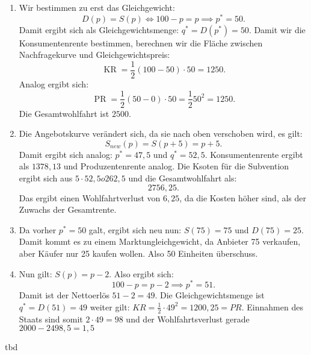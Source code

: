 \begin{solution}
	\begin{enumerate}
		\item Wir bestimmen zu erst das Gleichgewicht:
		      \[
			      D(p) = S(p) \iff 100-p = p \implies p^* = 50
			      .\]
		      Damit ergibt sich als Gleichgewichtsmenge: $q^*= D(p^*) = 50$. Damit wir die Konsumentenrente bestimmen, berechnen wir die Fläche zwischen Nachfragekurve und Gleichgewichtspreis:
		      \[
			      \operatorname{KR} = \frac{1}{2} (100-50) \cdot 50 = 1250
			      .\]
		      Analog ergibt sich:
		      \[
			      \operatorname{PR} = \frac{1}{2} (50-0) \cdot 50= \frac{1}{2} 50^2 = 1250
			      .\]
		      Die Gesamtwohlfahrt ist $2500$.
		\item Die Angebotskurve verändert sich, da sie nach oben verschoben wird, es gilt:
		      \[
			      S_{new}(p) = S(p+5) = p+5
			      .\]
		      Damit ergibt sich analog: $p^* = 47,5$ und $q^* = 52,5$.
		      Konsumentenrente ergibt  als $1378,13$ und Produzentenrente analog.
		      Die Ksoten für die Subvention ergibt sich aus $5 \cdot 52,5 o 262,5$ und die Gesamtwohlfahrt als:
		      \[
			      2756,25
			      .\] Das ergibt einen Wohlfahrtverlust von $6,25$, da die Kosten höher sind, als der Zuwachs der Gesamtrente.
		\item Da vorher $p^* = 50$ galt, ergibt sich neu nun: $S(75) = 75$ und $D(75) = 25$. Damit kommt es zu einem Marktungleichgewicht, da Anbieter 75 verkaufen, aber Käufer nur 25 kaufen wollen. Also 50 Einheiten überschuss.
		\item Nun gilt: $S(p) = p-2$. Also ergibt sich:
		      \[
			      100-p = p-2 \implies p^* = 51
			      .\]
		      Damit ist der Nettoerlös $51-2=49$. Die Gleichgewichtsmenge ist $q^* = D(51) = 49$
		      weiter gilt: $KR= \frac{1}{2}\cdot 49^2 = 1200,25 = PR$.  Einnahmen des Staats sind somit $2\cdot 49 = 98$ und der Wohlfahrtsverlust gerade $2000-2498,5 = 1,5$
	\end{enumerate}
\end{solution}


\begin{question}
	tbd
\end{question}

